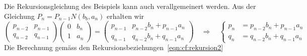 Die Rekursionsgleichung des Beispiels kann auch verallgemeinert werden.
Aus der Gleichung
$P_{n} = P_{n-1}N(b_b,a_n)$ erhalten wir
\begin{equation}
\begin{pmatrix}
p_{n-2}&p_{n-1}\\
q_{n-2}&q_{n-1}
\end{pmatrix}
\begin{pmatrix}
0&b_n\\
1&a_n
\end{pmatrix}
=
\begin{pmatrix}
p_{n-1}&p_{n-2}b_n + p_{n-1}a_n\\
q_{n-1}&q_{n-2}b_n + q_{n-1}a_n
\end{pmatrix}
\quad\Rightarrow\quad
\left\{
\begin{aligned}
p_n&= p_{n-2}b_n + p_{n-1}a_n\\
q_n&= q_{n-2}b_n + q_{n-1}a_n
\end{aligned}
\right.
\label{eqn:cf:rekursion2}
\end{equation}
Die Berechnung gemäss den Rekursionsbeziehungen~\eqref{eqn:cf:rekursion2}
